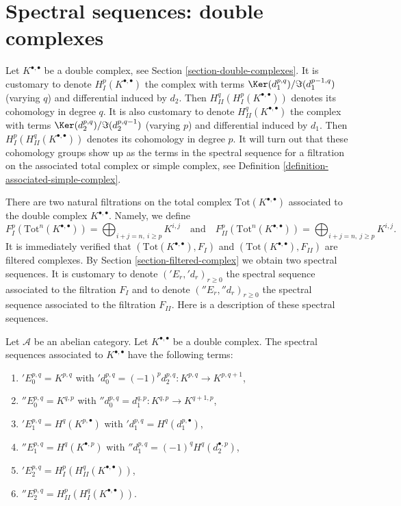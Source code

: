 \section{Spectral sequences: double complexes}
\label{section-double-complex}

\noindent
Let $K^{\bullet, \bullet}$ be a double complex, see
Section \ref{section-double-complexes}. It is customary to denote
$H^p_I(K^{\bullet, \bullet})$
the complex with terms $\Ker(d_1^{p, q})/\Im(d_1^{p - 1, q})$
(varying $q$) and differential induced by $d_2$.
Then $H^q_{II}(H^p_I(K^{\bullet, \bullet}))$ denotes its cohomology in
degree $q$. It is also customary to denote $H^q_{II}(K^{\bullet, \bullet})$
the complex with terms $\Ker(d_2^{p, q})/\Im(d_2^{p, q - 1})$
(varying $p$) and differential induced by $d_1$.
Then $H^p_I(H^q_{II}(K^{\bullet, \bullet}))$ denotes its cohomology in
degree $p$. It will turn out that these cohomology groups show up
as the terms in the spectral sequence for a filtration on the
associated total complex or simple complex, see
Definition \ref{definition-associated-simple-complex}.

\medskip\noindent
There are two natural filtrations on the total complex
$\text{Tot}(K^{\bullet, \bullet})$
associated to the double complex $K^{\bullet, \bullet}$. Namely, we
define
$$
F_I^p(\text{Tot}^n(K^{\bullet, \bullet})) =
\bigoplus\nolimits_{i + j = n, \ i \geq p} K^{i, j}
\quad
\text{and}
\quad
F_{II}^p(\text{Tot}^n(K^{\bullet, \bullet})) =
\bigoplus\nolimits_{i + j = n, \ j \geq p} K^{i, j}.
$$
It is immediately verified that $(\text{Tot}(K^{\bullet, \bullet}), F_I)$ and
$(\text{Tot}(K^{\bullet, \bullet}), F_{II})$ are filtered complexes.
By Section \ref{section-filtered-complex}
we obtain two spectral sequences. It is customary to
denote $({}'E_r, {}'d_r)_{r \geq 0}$ the spectral sequence associated
to the filtration $F_I$ and to denote $({}''E_r, {}''d_r)_{r \geq 0}$
the spectral sequence associated to the filtration $F_{II}$.
Here is a description of these spectral sequences.

\begin{lemma}
\label{lemma-ss-double-complex}
Let $\mathcal{A}$ be an abelian category.
Let $K^{\bullet, \bullet}$ be a double complex.
The spectral sequences associated to $K^{\bullet, \bullet}$
have the following terms:
\begin{enumerate}
\item ${}'E_0^{p, q} = K^{p, q}$ with
${}'d_0^{p, q} = (-1)^p d_2^{p, q} : K^{p, q} \to K^{p, q + 1}$,
\item ${}''E_0^{p, q} = K^{q, p}$ with
${}''d_0^{p, q} = d_1^{q, p} : K^{q, p} \to K^{q + 1, p}$,
\item ${}'E_1^{p, q} = H^q(K^{p, \bullet})$ with
${}'d_1^{p, q} = H^q(d_1^{p, \bullet})$,
\item ${}''E_1^{p, q} = H^q(K^{\bullet, p})$ with
${}''d_1^{p, q} = (-1)^q H^q(d_2^{\bullet, p})$,
\item ${}'E_2^{p, q} = H^p_I(H^q_{II}(K^{\bullet, \bullet}))$,
\item ${}''E_2^{p, q} = H^p_{II}(H^q_I(K^{\bullet, \bullet}))$.
\end{enumerate}
\end{lemma}

